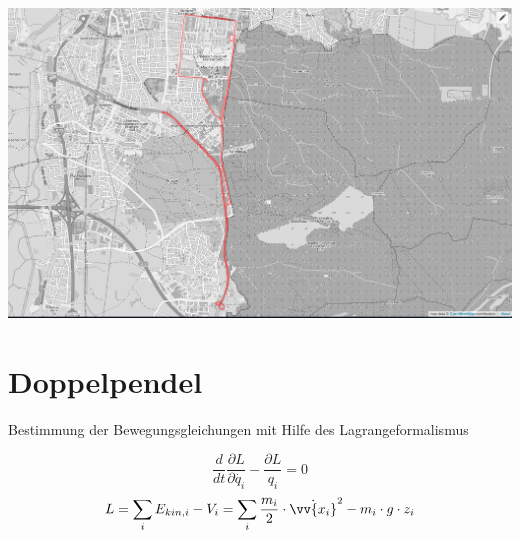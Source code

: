 \documentclass[compress,11pt]{beamer}
\begin{document}
\begin{frame}
	\includegraphics[width=\textwidth]{images/3/karte.png}
\end{frame}


\section{Doppelpendel}
\begin{frame}{Bestimmung der Bewegungsgleichungen mit Hilfe des Lagrangeformalismus}
	\begin{block}
		
		\begin{equation}
			\frac{d}{dt}\frac{\partial L}{\partial\dot{q_i}}-\frac{\partial L}{q_i} =0
		\label{lagrangegl}
		\end{equation}
		\begin{equation}
			 L=\sum_i E_{kin,i}-V_i=\sum_i \frac{m_i}{2}\cdot\dot{\vv{x_i}}^2 - m_i \cdot g \cdot z_i
		\end{equation}
	\end{block}
\end{frame}
\end{document}
